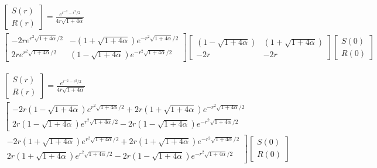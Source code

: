 \documentclass{article}
\begin{document}
\begin{multline*}
\begin{bmatrix}
S(r)\\
R(r)
\end{bmatrix}
= \frac{e^{r^{-2}-r^{2}/2}}{ 4r\sqrt{1 + 4\alpha} }\\
\begin{bmatrix}
-2re^{r^{2}\sqrt{1 + 4\alpha}/2}	&	-\left( 1 + \sqrt{1 + 4\alpha} \right)e^{-r^{2}\sqrt{1 + 4\alpha}/2}	\\
2re^{r^{2}\sqrt{1 + 4\alpha}/2}	&	\left( 1 - \sqrt{1 + 4\alpha} \right)e^{-r^{2}\sqrt{1 + 4\alpha}/2}	
\end{bmatrix}
\begin{bmatrix}
\left( 1 - \sqrt{1 + 4\alpha} \right)	&	\left( 1 + \sqrt{1 + 4\alpha} \right)	\\
-2r										&	-2r	
\end{bmatrix}
\begin{bmatrix}
S(0)\\
R(0)
\end{bmatrix}
\end{multline*}

\begin{multline*}
\begin{bmatrix}
S(r)\\
R(r)
\end{bmatrix}
= \frac{e^{r^{-2}-r^{2}/2}}{ 4r\sqrt{1 + 4\alpha} }\\
\left[
\begin{matrix}
-2r\left( 1 - \sqrt{1 + 4\alpha} \right)e^{r^{2}\sqrt{1 + 4\alpha}/2} +2r\left( 1 + \sqrt{1 + 4\alpha} \right)e^{-r^{2}\sqrt{1 + 4\alpha}/2}	\\
2r\left( 1 - \sqrt{1 + 4\alpha} \right)e^{r^{2}\sqrt{1 + 4\alpha}/2} -2r\left( 1 - \sqrt{1 + 4\alpha} \right)e^{-r^{2}\sqrt{1 + 4\alpha}/2}	
\end{matrix}
\right.
\\
\left.
\begin{matrix}
-2r\left( 1 + \sqrt{1 + 4\alpha} \right)e^{r^{2}\sqrt{1 + 4\alpha}/2} +2r\left( 1 + \sqrt{1 + 4\alpha} \right)e^{-r^{2}\sqrt{1 + 4\alpha}/2}	\\
2r\left( 1 + \sqrt{1 + 4\alpha} \right)e^{r^{2}\sqrt{1 + 4\alpha}/2} -2r\left( 1 - \sqrt{1 + 4\alpha} \right)e^{-r^{2}\sqrt{1 + 4\alpha}/2}	
\end{matrix}
\right]
\begin{bmatrix}
S(0)\\
R(0)
\end{bmatrix}
\end{multline*}
\end{document}
